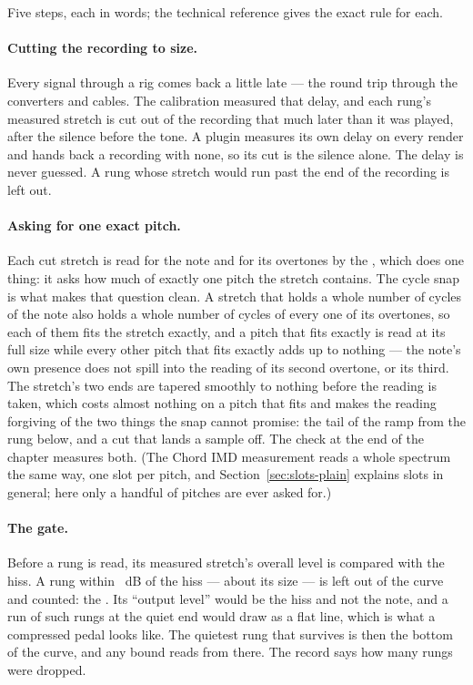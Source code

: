 \documentclass[11pt,a4paper]{article}
\begin{document}
Five steps, each in words; the technical reference gives the exact rule
for each.

\paragraph{Cutting the recording to size.} Every signal through a rig
comes back a little late --- the round trip through the converters and
cables. The calibration measured that delay, and each rung's measured
stretch is cut out of the recording that much later than it was played,
after the silence before the tone. A plugin measures its own delay on
every render and hands back a recording with none, so its cut is the
silence alone. The delay is never guessed. A rung whose stretch would run
past the end of the recording is left out.

\paragraph{Asking for one exact pitch.} Each cut stretch is read for the
note and for its overtones by the , which does one
thing: it asks how much of exactly one pitch the stretch contains. The
cycle snap is what makes that question clean. A stretch that holds a
whole number of cycles of the note also holds a whole number of cycles of
every one of its overtones, so each of them fits the stretch exactly, and
a pitch that fits exactly is read at its full size while every other
pitch that fits exactly adds up to nothing --- the note's own presence
does not spill into the reading of its second overtone, or its third. The
stretch's two ends are tapered smoothly to nothing before the reading is
taken, which costs almost nothing on a pitch that fits and makes the
reading forgiving of the two things the snap cannot promise: the tail of
the ramp from the rung below, and a cut that lands a sample off. The
check at the end of the chapter measures both. (The Chord IMD measurement
reads a whole spectrum the same way, one slot per pitch, and
Section~\ref{sec:slots-plain} explains slots in general; here only a
handful of pitches are ever asked for.)

\paragraph{The gate.} Before a rung is read, its measured stretch's
overall level is compared with the hiss. A rung within
\cmpGateDB{}~dB of the hiss --- about \cmpGateRatioWords{} its size --- is
left out of the curve and counted: the . Its ``output
level'' would be the hiss and not the note, and a run of such rungs at
the quiet end would draw as a flat line, which is what a compressed pedal
looks like. The quietest rung that survives is then the bottom of the
curve, and any bound reads from there. The record says how many rungs
were dropped.
\end{document}
